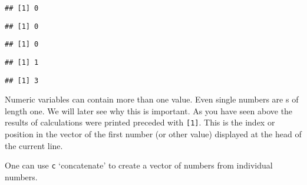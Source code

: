 \documentclass[paper=a4,headsepline,BCOR=12mm,twoside,open=right,%
titlepage,headings=small,fontsize=10pt,index=totoc,bibliography=totoc,%
captions=tableheading,captions=nooneline]{scrbook}\usepackage{knitr}
\begin{document}
\begin{knitrout}\footnotesize
{}\color{fgcolor}\begin{kframe}
\begin{alltt}
 \hlkwb{<-}  \hlkwb{<-}  \hlkwb{<-} 
\end{alltt}
\begin{verbatim}
## [1] 0
\end{verbatim}
\begin{alltt}
\end{alltt}
\begin{verbatim}
## [1] 0
\end{verbatim}
\begin{alltt}
\end{alltt}
\begin{verbatim}
## [1] 0
\end{verbatim}
\begin{alltt}
 \hlkwb{->} 
\end{alltt}
\begin{verbatim}
## [1] 1
\end{verbatim}
\begin{alltt}
 \hlkwb{=} 
\end{alltt}
\begin{verbatim}
## [1] 3
\end{verbatim}
\end{kframe}
\end{knitrout}

Numeric variables can contain more than one value. Even single numbers are s of length one. We will later see why this is important. As you have seen above the results of calculations were printed preceded with \texttt{[1]}. This is the index or position in the vector of the first number (or other value) displayed at the head of the current line.

One can use \texttt{c} `concatenate' to create a vector of numbers from individual numbers.
\end{document}
